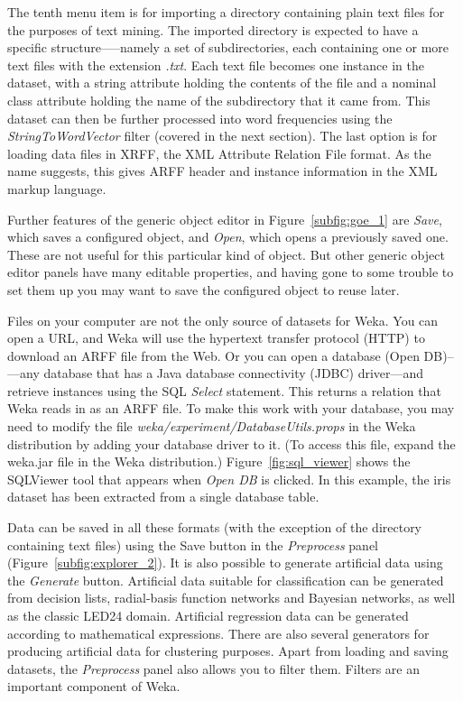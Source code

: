 The tenth menu item is for importing a directory containing plain text
files for the purposes of text mining. The imported directory is
expected to have a specific structure—--namely a set of
subdirectories, each containing one or more text files with the
extension \textit{.txt}. Each text file becomes one instance in the
dataset, with a string attribute holding the contents of the file and
a nominal class attribute holding the name of the subdirectory that it
came from. This dataset can then be further processed into word
frequencies using the \textit{StringToWordVector} filter (covered in
the next section). The last option is for loading data files in XRFF,
the XML Attribute Relation File format. As the name suggests, this
gives ARFF header and instance information in the XML markup language.

Further features of the generic object editor in Figure~\ref{subfig:goe_1} are
\textit{Save}, which saves a configured object, and \textit{Open},
which opens a previously saved one. These are not useful for this
particular kind of object. But other generic object editor panels have
many editable properties, and having gone to some trouble to set them
up you may want to save the configured object to reuse later.

Files on your computer are not the only source of datasets for
Weka. You can open a URL, and Weka will use the hypertext transfer
protocol (HTTP) to download an ARFF file from the Web. Or you can open
a database (Open DB)--—any database that has a Java database
connectivity (JDBC) driver—and retrieve instances using the SQL
\textit{Select} statement. This returns a relation that Weka reads in
as an ARFF file. To make this work with your database, you may need to
modify the file \textit{weka/experiment/DatabaseUtils.props} in the
Weka distribution by adding your database driver to it. (To access
this file, expand the weka.jar file in the Weka distribution.)
Figure~\ref{fig:sql_viewer} shows the SQLViewer tool that appears when
\textit{Open DB} is clicked. In this example, the iris dataset has been
extracted from a single database table.

Data can be saved in all these formats (with the exception of the
directory containing text files) using the Save button in the
\textit{Preprocess} panel (Figure~\ref{subfig:explorer_2}). It is also
possible to generate artificial data using the \textit{Generate}
button. Artificial data suitable for classification can be generated
from decision lists, radial-basis function networks and Bayesian
networks, as well as the classic LED24 domain. Artificial regression
data can be generated according to mathematical expressions. There are
also several generators for producing artificial data for clustering
purposes. Apart from loading and saving datasets, the
\textit{Preprocess} panel also allows you to filter them. Filters are
an important component of Weka.

